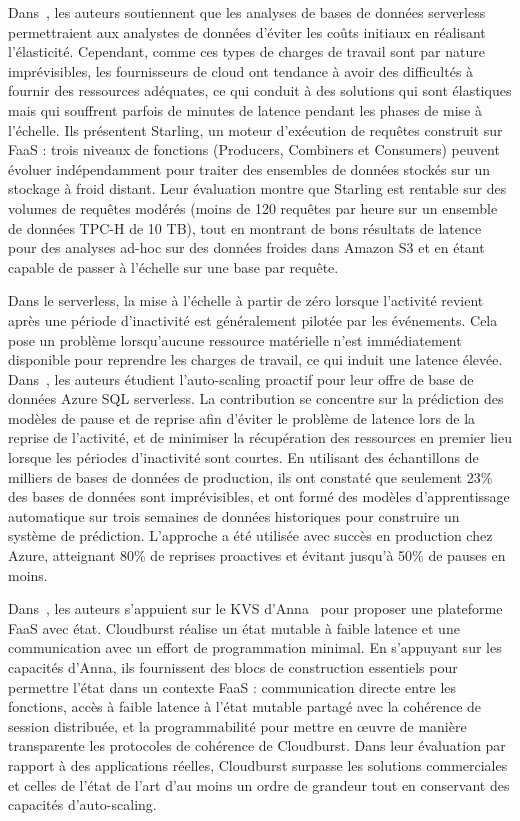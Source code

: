 Dans~\cite{Perron2020StarlingAS}, les auteurs soutiennent que les analyses de bases de données serverless permettraient aux analystes de données d'éviter les coûts initiaux en réalisant l'élasticité. Cependant, comme ces types de charges de travail sont par nature imprévisibles, les fournisseurs de cloud ont tendance à avoir des difficultés à fournir des ressources adéquates, ce qui conduit à des solutions qui sont élastiques mais qui souffrent parfois de minutes de latence pendant les phases de mise à l'échelle. Ils présentent Starling, un moteur d'exécution de requêtes construit sur FaaS : trois niveaux de fonctions (Producers, Combiners et Consumers) peuvent évoluer indépendamment pour traiter des ensembles de données stockés sur un stockage à froid distant. Leur évaluation montre que Starling est rentable sur des volumes de requêtes modérés (moins de 120 requêtes par heure sur un ensemble de données TPC-H de 10 TB), tout en montrant de bons résultats de latence pour des analyses ad-hoc sur des données froides dans Amazon S3 et en étant capable de passer à l'échelle sur une base par requête.

Dans le serverless, la mise à l'échelle à partir de zéro lorsque l'activité revient après une période d'inactivité est généralement pilotée par les événements. Cela pose un problème lorsqu'aucune ressource matérielle n'est immédiatement disponible pour reprendre les charges de travail, ce qui induit une latence élevée. Dans~\cite{poppe2022moneyball}, les auteurs étudient l'auto-scaling proactif pour leur offre de base de données Azure SQL serverless. La contribution se concentre sur la prédiction des modèles de pause et de reprise afin d'éviter le problème de latence lors de la reprise de l'activité, et de minimiser la récupération des ressources en premier lieu lorsque les périodes d'inactivité sont courtes. En utilisant des échantillons de milliers de bases de données de production, ils ont constaté que seulement 23\% des bases de données sont imprévisibles, et ont formé des modèles d'apprentissage automatique sur trois semaines de données historiques pour construire un système de prédiction. L'approche a été utilisée avec succès en production chez Azure, atteignant 80\% de reprises proactives et évitant jusqu'à 50\% de pauses en moins.

Dans~\cite{Sreekanti2020CloudburstSF}, les auteurs s'appuient sur le KVS d'Anna~\cite{Wu2018AnnaAK} pour proposer une plateforme FaaS avec état. Cloudburst réalise un état mutable à faible latence et une communication avec un effort de programmation minimal. En s'appuyant sur les capacités d'Anna, ils fournissent des blocs de construction essentiels pour permettre l'état dans un contexte FaaS : communication directe entre les fonctions, accès à faible latence à l'état mutable partagé avec la cohérence de session distribuée, et la programmabilité pour mettre en œuvre de manière transparente les protocoles de cohérence de Cloudburst. Dans leur évaluation par rapport à des applications réelles, Cloudburst surpasse les solutions commerciales et celles de l'état de l'art d'au moins un ordre de grandeur tout en conservant des capacités d'auto-scaling.

